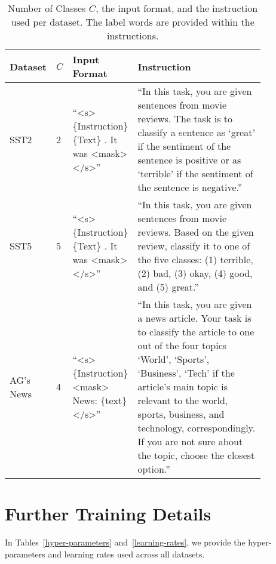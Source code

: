 \documentclass[11pt]{article}
\begin{document}
\begin{table*}
\centering
\caption{Number of Classes $C$, the input format, and the instruction used per dataset. The label words are provided within the instructions.}
\begin{tabular}{ p{0.1\linewidth} | p{0.05\linewidth} | p{0.2\linewidth} | p{0.5\linewidth} }
\hline
Dataset & $C$ & Input Format & Instruction \\
\hline
SST2 & 2 & ``<s> \{Instruction\} \{Text\} . It was <mask> </s>'' & ``In this task, you are given sentences from movie reviews. The task is to classify a sentence as `great' if
the sentiment of the sentence is positive or as `terrible' if the sentiment of the sentence is negative.''\\
\hline
SST5 & 5 & ``<s> \{Instruction\} \{Text\} . It was <mask> </s>'' & ``In this task, you are given sentences from movie reviews. Based on the given review, classify it to one of
the five classes: (1) terrible, (2) bad, (3) okay, (4) good, and (5) great.''\\
\hline
AG’s News & 4 & ``<s> \{Instruction\} <mask> News: \{text\} </s>'' & ``In this task, you are given a news article. Your task is to classify the article to one out of the four topics
`World', `Sports', `Business', `Tech' if the article's main topic is relevant to the world, sports, business, and technology, correspondingly. If you are not sure about the topic, choose the closest option.''\\
\hline
\end{tabular}
\label{task-input-format}
\end{table*}

\section{Further Training Details}
\label{training-details-extra:appendix}
In Tables~\ref{hyper-parameters} and~\ref{learning-rates}, we provide the hyper-parameters and learning rates used across all datasets.
\end{document}
